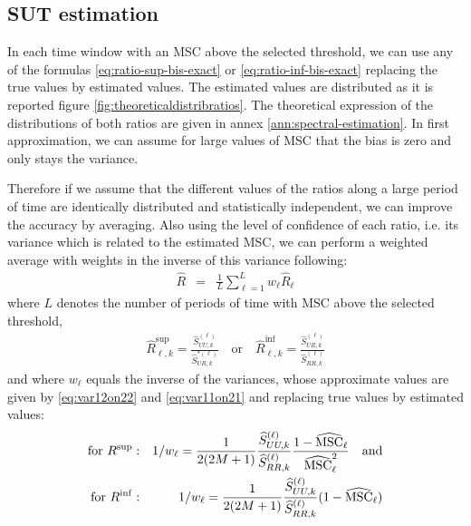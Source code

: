 

\subsection{SUT estimation}
In each time window with an MSC above the selected threshold, we can use any of the formulas \eqref{eq:ratio-sup-bis-exact} or  \eqref{eq:ratio-inf-bis-exact} replacing the true values by estimated values. The estimated values are distributed as it is reported figure \ref{fig:theoreticaldistribratios}.  The theoretical expression of the distributions of both ratios are given in annex \ref{ann:spectral-estimation}. In first approximation, we can assume for large values of MSC that the bias is zero and only stays the variance.

Therefore if we assume that the different values of the ratios along a large period of time are identically distributed and statistically independent, we can improve the accuracy by averaging. Also using the level of confidence of each ratio, i.e. its variance which is related to the  estimated MSC, we can perform a weighted average with weights in the inverse of this variance following:
\begin{eqnarray}
\label{eq:weithted-average-Ratio}
 \hat R &=& \frac{1}{L}\sum_{\ell=1}^{L}w_{\ell}\hat R_{\ell}
\end{eqnarray}
where $L$ denotes the number of periods of time with MSC above the selected threshold,
\begin{eqnarray}
\label{eq:estimated-Ratio}
\hat R_{\ell,k} ^{\sup}=\frac{\hat S_{UU,k}^{(\ell)}}{\hat S^{*(\ell)}_{UR,k}}
\quad
\mathrm{or}
\quad
\hat R_{\ell,k}^{\inf} =\frac{\hat S_{UR,k}^{(\ell)}}{\hat S_{RR,k}^{(\ell)}}
\end{eqnarray}
and where $w_{\ell}$ equals the inverse of the variances, whose approximate values are given by \eqref{eq:var12on22} and \eqref{eq:var11on21} and replacing true values by estimated values:
\begin{eqnarray}
\label{eq:weights}
\mathrm{for}\,\, R^{\sup}:  &&1/w_{\ell}=\frac{1}{2(2M+1)}
 \frac{\widehat S_{UU,k}^{(\ell)}}{\widehat S_{RR,k}^{(\ell)}} 
  \frac{1-\widehat{\mathrm{MSC}}_{\ell}}{\widehat{\mathrm{MSC}}_{\ell}^{2}}
\quad\mathrm{and}\\
\mathrm{for }\,\, R^{\inf}:  && 1/w_{\ell}= \frac{1}{2(2M+1)}
   \frac{\widehat S_{UU,k}^{(\ell)}}{\widehat S_{RR,k}^{(\ell)}} (1-\widehat{\mathrm{MSC}}_{\ell})
\end{eqnarray}

